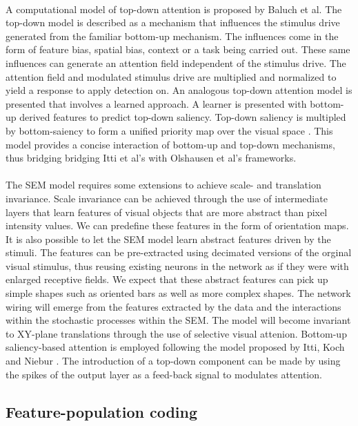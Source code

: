 \documentclass{report}
\begin{document}
\paragraph{}A computational model of top-down attention is proposed by Baluch et al. The top-down model is described as a mechanism that influences the stimulus drive generated from the familiar bottom-up mechanism. The influences come in the form of feature bias, spatial bias, context or a task being carried out. These same influences can generate an attention field independent of the stimulus drive. The attention field and modulated stimulus drive are multiplied and normalized to yield a response to apply detection on. An analogous top-down attention model is presented that involves a learned approach. A learner is presented with bottom-up derived features to predict top-down saliency. Top-down saliency is multipled by bottom-saiency to form a unified priority map over the visual space \cite{Baluch2011}. This model provides a concise interaction of bottom-up and top-down mechanisms, thus bridging bridging Itti et al's with Olshausen et al's frameworks.

\paragraph{}The SEM model requires some extensions to achieve scale- and translation invariance. Scale invariance can be achieved through the use of intermediate layers that learn features of visual objects that are more abstract than pixel intensity values. We can predefine these features in the form of orientation maps. It is also possible to let the SEM model learn abstract features driven by the stimuli. The features can be pre-extracted using decimated versions of the orginal visual stimulus, thus reusing existing neurons in the network as if they were with enlarged receptive fields. We expect that these abstract features can pick up simple shapes such as oriented bars as well as more complex shapes. The network wiring will emerge from the features extracted by the data and the interactions within the stochastic processes within the SEM. The model will become invariant to XY-plane translations through the use of selective visual attenion. Bottom-up saliency-based attention is employed following the model proposed by Itti, Koch and Niebur \cite{Itti2000}. The introduction of a top-down component can be made by using the spikes of the output layer as a feed-back signal to modulates attention.

\subsection{Feature-population coding}
\end{document}
